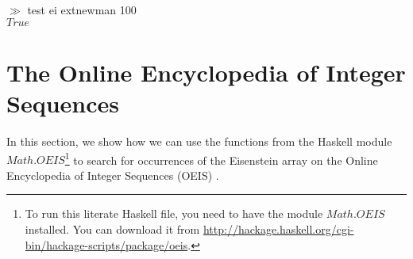\documentclass[leqno,fleqn,12pt]{article}
\newcommand{\Conid}[1]{\mathit{#1}}
\def\prompt#1{\noindent$\gg$ #1}
\begin{document}
\medskip
\prompt{test ei extnewman 100}\\
\ensuremath{\Conid{True}} %

\section{The Online Encyclopedia of Integer Sequences} In this
section, we show how we can use the functions from the Haskell module
\ensuremath{\Conid{\Conid{Math}.OEIS}}\footnote{To run this literate Haskell file, you need to
have the module \ensuremath{\Conid{\Conid{Math}.OEIS}} installed. You can download it from
\url{http://hackage.haskell.org/cgi-bin/hackage-scripts/package/oeis}.}
to search for occurrences of the Eisenstein array on the Online
Encyclopedia of Integer Sequences (OEIS) \cite{sloane-integers}.
\end{document}
